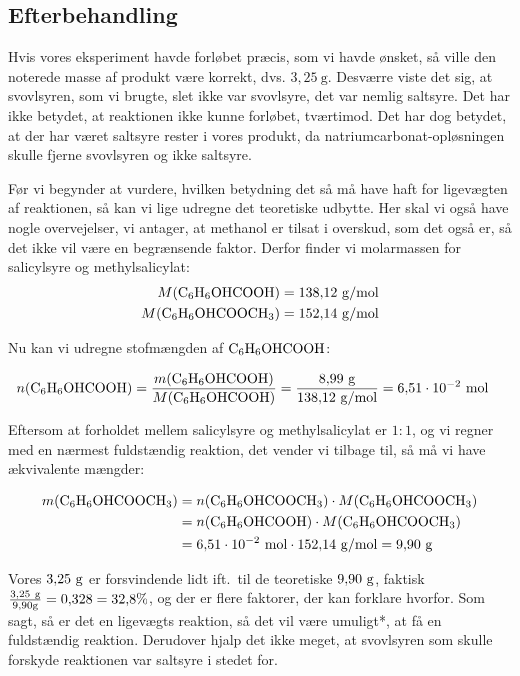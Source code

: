 \subsection*{Efterbehandling}
Hvis vores eksperiment havde forløbet præcis,
som vi havde ønsket, så ville den noterede
masse af produkt være korrekt, dvs. $3{,}25\ \unit{\gram}$.
Desværre viste det sig, at svovlsyren, som vi brugte, slet ikke var svovlsyre,
det var nemlig saltsyre. Det har ikke betydet,
at reaktionen ikke kunne forløbet, tværtimod.
Det har dog betydet, at der har været saltsyre 
rester i vores produkt, da natriumcarbonat-opløsningen
skulle fjerne svovlsyren og ikke saltsyre.

Før vi begynder at vurdere, hvilken betydning
det så må have haft for ligevægten af reaktionen,
så kan vi lige udregne det teoretiske udbytte.
Her skal vi også have nogle overvejelser, vi antager,
at methanol er tilsat i overskud, som det også er,
så det ikke vil være en begrænsende faktor.
Derfor finder vi molarmassen for salicylsyre og
methylsalicylat:
\begin{align*}
    M(\ce{C6H6OHCOOH})&=138{,}12\ \unit{\gram/\mol} \\
    M(\ce{C6H6OHCOOCH3})&=152{,}14\ \unit{\gram/\mol}
\end{align*}

Nu kan vi udregne stofmængden af $\ce{C6H6OHCOOH}$:

\begin{align*}
    n(\ce{C6H6OHCOOH})&=\frac{m(\ce{C6H6OHCOOH})}{
        M(\ce{C6H6OHCOOH})
    }=\frac{8{,}99\ \unit{\gram}}{138{,}12\ \unit{\gram/\mol}}
    =6{,}51 \cdot 10^{-2}\ \unit{\mol}
\end{align*}

Eftersom at forholdet mellem salicylsyre og methylsalicylat er $1:1$,
og vi regner med en nærmest fuldstændig reaktion, det vender vi tilbage til,
så må vi have ækvivalente mængder:

\begin{align*}
    m(\ce{C6H6OHCOOCH3})&=n(\ce{C6H6OHCOOCH3}) \cdot M(\ce{C6H6OHCOOCH3})
    \\
    &=n(\ce{C6H6OHCOOH}) \cdot M(\ce{C6H6OHCOOCH3})
    \\
    &=6{,}51 \cdot 10^{-2}\ \unit{\mol} \cdot 152{,}14\ \unit{\gram/\mol}
    =9{,}90\ \unit{\gram}
\end{align*}

Vores $3{,}25\ \g$ er forsvindende lidt ift.~til de teoretiske $9{,}90\ \g$,
faktisk $\frac{3{,}25\ \g}{9{,}90 \g}=0{,}328=32{,}8\%$,
og der er flere faktorer, der kan forklare hvorfor. Som sagt,
så er det en ligevægts reaktion, så det vil være umuligt*,
at få en fuldstændig reaktion. Derudover hjalp det ikke meget,
at svovlsyren som skulle forskyde reaktionen var saltsyre i stedet for.
